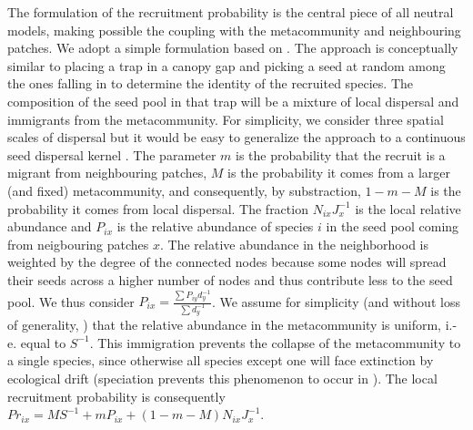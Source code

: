 \documentclass[12pt]{article}
\begin{document}
The formulation of the recruitment probability is the central piece of all
neutral models, making possible the coupling with the metacommunity and
neighbouring patches. We adopt a simple formulation based on
\parencite{Gravel2006}. The approach is conceptually similar to placing a trap
in a canopy gap and picking a seed at random among the ones falling in to
determine the identity of the recruited species. The composition of the seed
pool in that trap will be a mixture of local dispersal and immigrants from the
metacommunity. For simplicity, we consider three spatial scales of dispersal but
it would be easy to generalize the approach to a continuous seed dispersal
kernel \parencite{Gravel2006}. The parameter $m$ is the probability that the
recruit is a migrant from neighbouring patches, $M$ is the probability it comes
from a larger (and fixed) metacommunity, and consequently, by substraction,
$1-m-M$ is the probability it comes from local dispersal. The fraction
$N_{ix}J_x^{-1}$ is the local relative abundance and $P_{ix}$ is the relative
abundance of species $i$ in the seed pool coming from neigbouring patches $x$.
The relative abundance in the neighborhood is weighted by the degree of the
connected nodes because some nodes will spread their seeds across a higher
number of nodes and thus contribute less to the seed pool. We thus consider
$P_{ix} =\frac{\sum P_{iy}d_y^{-1}}{\sum d_y^{-1}}$. We assume for simplicity
(and without loss of generality, \parencite{Bell2000}) that the relative
abundance in the metacommunity is uniform, i.-e. equal to $S^{-1}$. This
immigration prevents the collapse of the metacommunity to a single species,
since otherwise all species except one will face extinction by ecological drift
(speciation prevents this phenomenon to occur in \textcite{Hubbell2001}). The
local recruitment probability is consequently $Pr_{ix} = MS^{-1} + mP_{ix} +
(1-m-M)N_{ix}J_x^{-1}$.
\end{document}
